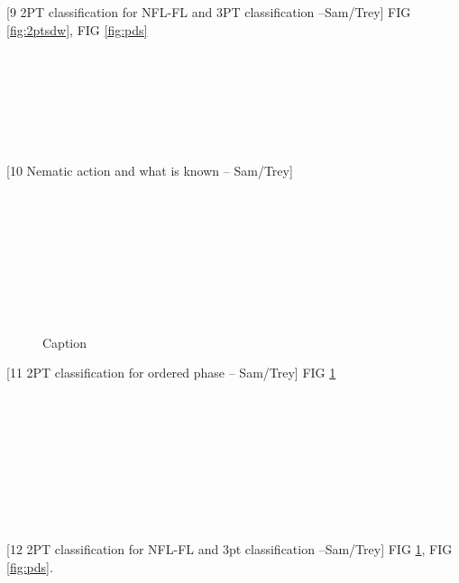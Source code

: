 \documentclass[amsmath,amssymb, aps, prx, longbibliography, twocolumn]{revtex4-1}
\begin{document}
[9 2PT classification for NFL-FL and 3PT classification --Sam/Trey]
FIG \ref{fig:2ptsdw}, FIG \ref{fig:pds}
\\
\\
\\
\\
\\
\\
\\
\\




[10 Nematic action and what is known -- Sam/Trey]
\\
\\
\\
\\
\\
\\
\\
\\
\\

\begin{figure} [t]
    \centering

    \caption{Caption}
    \label{fig:2ptnem}
\end{figure}

[11 2PT classification for ordered phase -- Sam/Trey]
FIG \ref{fig:2ptnem}
\\
\\
\\
\\
\\
\\
\\
\\
\\
\\


[12 2PT classification for NFL-FL and 3pt classification --Sam/Trey]
FIG \ref{fig:2ptnem}, FIG \ref{fig:pds}.
\\
\\
\\
\\
\\
\\
\\
\\
\\
\end{document}

